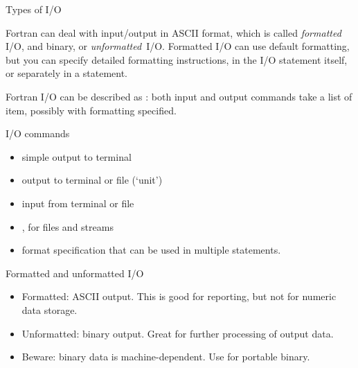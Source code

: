 
 {Types of I/O}

Fortran can deal with input/output in ASCII format, which is called
\emph{formatted} I/O, and binary, or
\emph{unformatted}~I/O.  Formatted I/O can use
default formatting, but you can specify detailed formatting
instructions, in the I/O statement itself, or separately in a
 statement.

Fortran I/O can be described as :
both input and output commands take a list of item, possibly with
formatting specified.

\begin{block}{I/O commands}
  \label{sl:fio-commands}
  \begin{itemize}
  \item {} simple output to terminal
  \item {} output to terminal or file (`unit')
  \item {} input from terminal or file
  \item {},  for files and
    streams
  \item {} format specification that can be used
    in multiple statements.
  \end{itemize}
\end{block}

\begin{block}{Formatted and unformatted I/O}
  \label{sl:fio-types}
  \begin{itemize}
  \item Formatted: ASCII output. This is good for reporting, but not
    for numeric data storage.
  \item Unformatted: binary output. Great for further processing of
    output data.
  \item Beware: binary data is machine-dependent. Use 
    for portable binary.
  \end{itemize}
\end{block}

